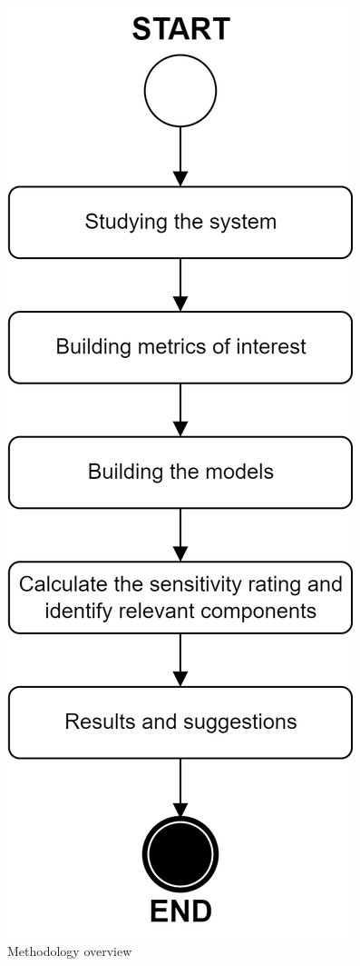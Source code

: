 \documentclass[conference]{IEEEtran}
\begin{document}
\begin{figure}[htbp]
\centerline{\includegraphics[scale=0.6]{img/methodology.png}}
\caption{Methodology overview}
\label{fig:methodology}
\end{figure}
\end{document}
